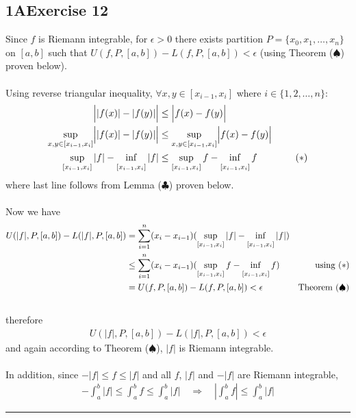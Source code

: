 \documentclass[12pt, letterpaper]{article}
\renewcommand{\L}{L}
\newcommand{\U}{U}
\renewcommand{\inf}{\mathop{\mathrm{inf}\vphantom{\mathrm{sup}}}}
\begin{document}
\subsection*{1\hspace{1pt}A\hspace{20pt}Exercise 12 }
Since $f$ is Riemann integrable, for $\epsilon>0$ there exists partition $P=\{x_0, x_1,\dots,x_n\}$ on $[a, b]$ such that $\U(f, P, [a,b])-\L(f, P, [a,b])<\epsilon$ (using Theorem ($\spadesuit$) proven below).
\\\\
Using reverse triangular inequality, $\forall x,y\in[x_{i-1}, x_i]$ where $i\in\{1,2,\dots,n\}$:
\begin{align*}
    \Bigl||f(x)|-|f(y)|\Bigr|
    &\leq
    \Bigl|f(x)-f(y)\Bigr|\\
    \sup_{x,y\in[x_{i-1}, x_i]}\Bigl||f(x)|-|f(y)|\Bigr|
    &\leq
    \sup_{x,y\in[x_{i-1}, x_i]}\Bigl|f(x)-f(y)\Bigr|\\
    \sup_{[x_{i-1}, x_i]}|f|-\inf_{[x_{i-1}, x_i]}|f|
    &\leq
    \sup_{[x_{i-1}, x_i]}f-\inf_{[x_{i-1}, x_i]}f \qquad\tag{$*$}
\end{align*}
where last line follows from Lemma ($\clubsuit$) proven below.
\\\\
Now we have
\begin{align*}
    \U(|f|, P, [a,b])-\L(|f|, P, [a,b])
    &=
    \sum_{i=1}^n(x_i-x_{i-1})(\sup_{[x_{i-1}, x_i]}|f|-\inf_{[x_{i-1}, x_i]}|f|)\\
    &\leq
    \sum_{i=1}^n(x_i-x_{i-1})(\sup_{[x_{i-1}, x_i]}f-\inf_{[x_{i-1}, x_i]}f)\qquad \qquad\text{using $(*)$}\\
    &=
    \U(f, P, [a,b])-\L(f, P, [a,b])< \epsilon\qquad \qquad\text{Theorem ($\spadesuit$)}
\end{align*}
\\
therefore
\begin{align*}
    \U(|f|, P, [a,b])-\L(|f|, P, [a,b]) < \epsilon
\end{align*}
and again according to Theorem ($\spadesuit$), $|f|$ is Riemann integrable.
\\\\
In addition, since $-|f|\leq f\leq|f|$ and all $f$, $|f|$ and $-|f|$ are Riemann integrable,
\begin{align*}
    -\int_a^b|f|\leq\int_a^bf\leq\int_a^b|f|\quad\Longrightarrow\quad\left|\int_a^bf\right|\leq\int_a^b|f|
\end{align*}
\hrule
\end{document}
